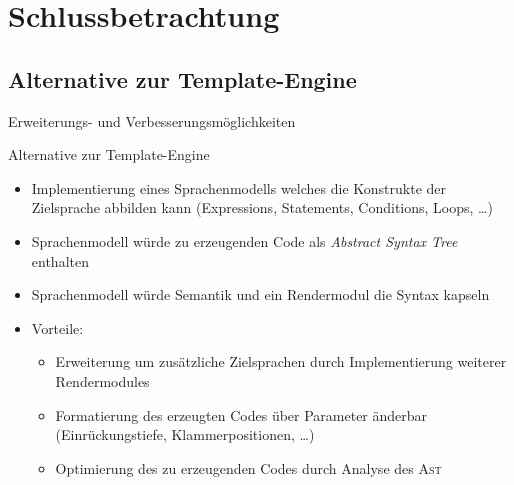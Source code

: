 \section{Schlussbetrachtung}
\subsection{Alternative zur Template-Engine}
\begin{frame}{Erweiterungs- und Verbesserungsmöglichkeiten}
    \begin{block}{Alternative zur Template-Engine}
        \begin{itemize}
            \item Implementierung eines Sprachenmodells welches die Konstrukte der Zielsprache abbilden kann (Expressions, Statements, Conditions, Loops, \ldots)
            \item Sprachenmodell würde zu erzeugenden Code als \emph{Abstract Syntax Tree} enthalten
            \item Sprachenmodell würde Semantik und ein Rendermodul die Syntax kapseln
            \item Vorteile:
            \begin{itemize}
                \item Erweiterung um zusätzliche Zielsprachen durch Implementierung weiterer Rendermodules
                \item Formatierung des erzeugten Codes über Parameter änderbar (Einrückungstiefe, Klammerpositionen, \ldots)
                \item Optimierung des zu erzeugenden Codes durch Analyse des \textsc{Ast}
            \end{itemize}
        \end{itemize}
    \end{block}
\end{frame}

